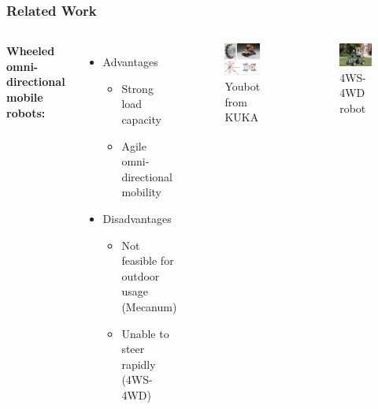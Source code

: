 \begin{frame} %
\frametitle{Related Work}
\begin{columns}
\textbf{Wheeled omni-directional mobile robots:}

\begin{itemize}
    \item Advantages
    \begin{itemize}
        \item Strong load capacity
        \item Agile omni-directional mobility
    \end{itemize}
    \item Disadvantages
    \begin{itemize}
        \item Not feasible for outdoor usage (Mecanum)
        \item Unable to steer rapidly (4WS-4WD)
    \end{itemize}
\end{itemize}

\begin{figure}
    \centering
    \vspace{-1.2cm}
    \includegraphics[width=4cm]{photos/mecanum.png} 
    \vspace{-0.3cm}
    \caption{Youbot from KUKA}
    \label{fig:Macanum}
    \vspace{-0.7cm}
\end{figure}

\begin{figure}
    \centering
    \includegraphics[width=4cm]{photos/4WS-4Wd.png} 
    \vspace{-0.3cm}
    \caption{4WS-4WD robot}
    \label{fig:4ws-4wd}
    \vspace{-0.7cm}
\end{figure}
\end{columns}
\end{frame}

